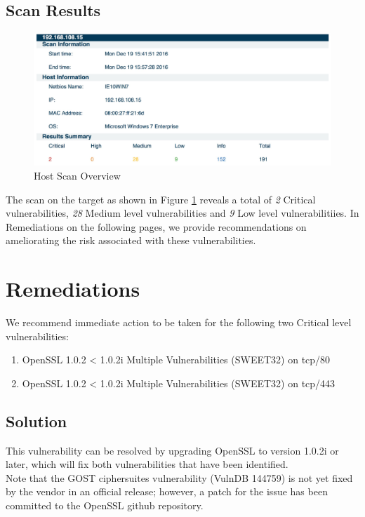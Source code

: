 \documentclass[11pt, oneside]{article}   	%
\begin{document}
\subsection{Scan Results}
\begin{figure}[h!]
	\centering
	\includegraphics[width=430pt]{nessus-scan-overview.jpg}
	\caption{Host Scan Overview}
	\label{HostScanOverview}
\end{figure}

The scan on the target as shown in Figure \ref{HostScanOverview} reveals a total of \emph{2} Critical vulnerabilities,
\emph{28} Medium level vulnerabilities and \emph{9} Low level vulnerabilitiies.
In Remediations on the following pages, we provide recommendations on 
ameliorating the risk associated with these vulnerabilities.

\clearpage
\section{Remediations}

We recommend immediate action to be taken for the following two Critical level vulnerabilities:

\begin{enumerate}
\item{OpenSSL 1.0.2 < 1.0.2i Multiple Vulnerabilities (SWEET32) on tcp/80}
\item{OpenSSL 1.0.2 < 1.0.2i Multiple Vulnerabilities (SWEET32) on tcp/443}
\end{enumerate}

\subsection{Solution}
This vulnerability can be resolved by upgrading OpenSSL to version 1.0.2i or later,
which will fix both vulnerabilities that have been identified. \\

Note that the GOST ciphersuites vulnerability (VulnDB 144759) is not yet
fixed by the vendor in an official release; however, a patch for the issue
has been committed to the OpenSSL github repository.\\
\end{document}
